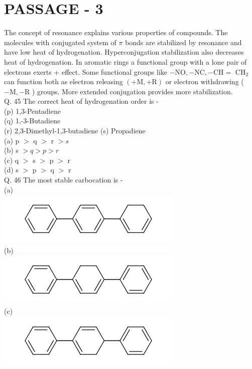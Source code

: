 \documentclass[10pt]{article}
\begin{document}
\section*{PASSAGE - 3}
The concept of resonance explains various properties of compounds. The molecules with conjugated system of $\pi$ bonds are stabilized by resonance and have low heat of hydrogenation. Hyperconjugation stabilization also decreases heat of hydrogenation. In aromatic rings a functional group with a lone pair of electrons exerts + effect. Some functional groups like $-\mathrm{NO},-\mathrm{NC},-\mathrm{CH}=$ $\mathrm{CH}_{2}$ can function both as electron releasing $(+\mathrm{M},+\mathrm{R})$ or electron withdrawing ( $-\mathrm{M},-\mathrm{R}$ ) groups. More extended conjugation provides more stabilization.\\
Q. 45 The correct heat of hydrogenation order is -\\
(p) 1,3-Pentadiene\\
(q) 1,-3-Butadiene\\
(r) 2,3-Dimethyl-1,3-butadiene (s) Propadiene\\
(a) p $>$ q $>$ r $>s$\\
(b) s $>q>p>r$\\
(c) q $>$ s $>$ p $>$ r\\
(d) s $>$ p $>$ q $>$ r\\
Q. 46 The most stable carbocation is -\\
(a)\\
\includegraphics{smile-58fa93bc4931031646051a3538cb519eb14afcfa}\\
(b)\\
\includegraphics{smile-9e73fe3b32d323109733f201559308d875b07da2}\\
(c)\\
\includegraphics{smile-9ff10705696cd35e7a8747c504da8987ace32cb0}\\
\end{document}

